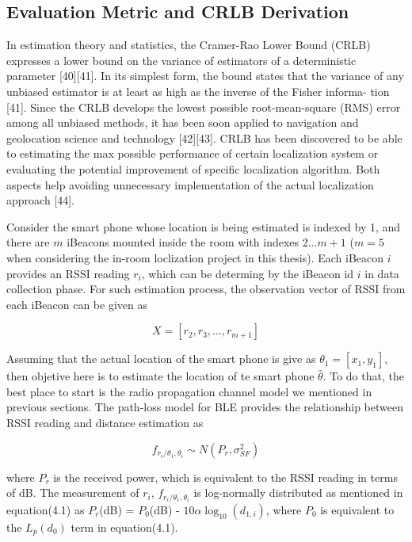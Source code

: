 \documentclass[12pt]{report}
\begin{document}
\subsection{Evaluation Metric and CRLB Derivation}
In estimation theory and statistics, the Cramer-Rao Lower Bound (CRLB) expresses a lower bound on the variance of estimators of a deterministic parameter [40][41]. In its simplest form, the bound states that the variance of any unbiased estimator is at least as high as the inverse of the Fisher informa- tion [41]. Since the CRLB develops the lowest possible root-mean-square (RMS) error among all unbiased methods, it has been soon applied to navigation and geolocation science and technology [42][43]. CRLB has been discovered to be able to estimating the max possible performance of certain localization system or evaluating the potential improvement of specific localization algorithm. Both aspects help avoiding unnecessary implementation of the actual localization approach [44].

Consider the smart phone whose location is being estimated is indexed by 1, and there are $m$ iBeacons mounted inside the room with indexes 2...$m + 1$ ($m = 5$ when considering the in-room loclization project in this thesis). Each iBeacon $i$ provides an RSSI reading $r_i$, which can be determing by the iBeacon id $i$ in data collection phase. For such estimation process, the observation vector of RSSI from each iBeacon can be given as 

\begin{equation}
X = [r_2, r_3, ..., r_{m + 1}]
\end{equation}

Assuming that the actual location of the smart phone is give as $\theta_1 = [x_1, y_1]$, then objetive here is to estimate the location of te smart phone $\hat{\theta}$. To do that, the best place to start is the radio propagation channel model we mentioned in previous sections. The path-loss model for BLE provides the relationship between RSSI reading and distance estimation as

\begin{equation}
f_{r_i/ \theta_1,\theta_i} \sim N(P_r, \sigma^2_{SF})
\end{equation}

where $P_r$ is the received power, which is equivalent to the RSSI reading in terms of dB. The measurement of $r_i$, $f_{r_i/ \theta_1,\theta_i}$ is log-normally distributed as mentioned in equation(4.1) as $P_r$(dB) = $P_0$(dB) - $10\alpha\log_{10} (d_{1,i})$, where $P_0$ is equivalent to the $L_p (d_0)$ term in equation(4.1). 
\end{document}
